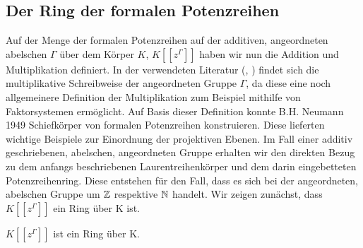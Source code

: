 \subsection{Der Ring der formalen Potenzreihen} 
Auf der Menge der formalen Potenzreihen auf der additiven, angeordneten abelschen $\Gamma$ über dem Körper $K$, $K[[z^\Gamma]]$ haben wir nun die Addition und Multiplikation definiert. In der verwendeten Literatur (\cite{priesscrampe83}, \cite{fuchs66}) findet sich die multiplikative Schreibweise der angeordneten Gruppe $\Gamma$, da diese eine noch allgemeinere Definition der Multiplikation zum Beispiel mithilfe von Faktorsystemen ermöglicht. Auf Basis dieser Definition konnte B.H. Neumann 1949 Schiefkörper von formalen Potenzreihen konstruieren. Diese lieferten wichtige Beispiele zur Einordnung der projektiven Ebenen.
Im Fall einer additiv geschriebenen, abelschen, angeordneten Gruppe erhalten wir den direkten Bezug zu dem anfangs beschriebenen Laurentreihenkörper und dem darin eingebetteten Potenzreihenring. Diese entstehen für den Fall, dass es sich bei der angeordneten, abelschen Gruppe um $\mathbb{Z}$ respektive $\mathbb{N}$ handelt. 
Wir zeigen zunächst, dass $K[[z^\Gamma]]$ ein Ring über K ist.
%
%
\begin{satz}
$K[[z^\Gamma]]$ ist ein Ring über K. 
\end{satz}
